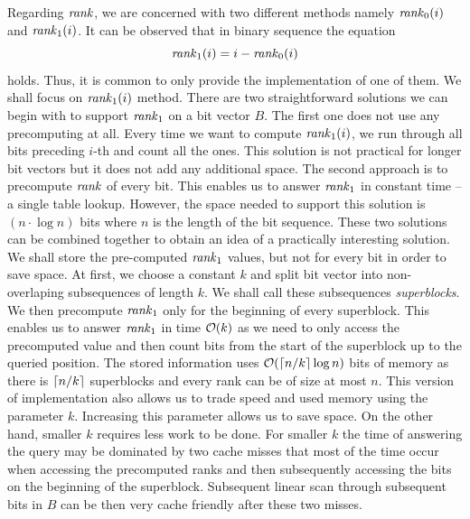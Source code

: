 Regarding $\mathit{rank}$, we are concerned with two different methods namely $\mathit{rank}_0(i)$
and $\mathit{rank}_1(i)$. It can be observed that in binary sequence the equation
$$\mathit{rank}_1(i) = i - \mathit{rank}_0(i)$$ holds. Thus, it is common to only provide
the implementation of one of them. We shall focus on $\mathit{rank}_1(i)$ method. There are two
straightforward solutions we can begin with to support $\mathit{rank}_1$ on a bit vector
$B$. The first one does not use any precomputing at all. Every time we want
to compute $\mathit{rank}_1(i)$, we run through all bits preceding $i$-th and count all
the ones. This solution is not practical for longer bit vectors but it does not
add any additional space. The second approach is to precompute $\mathit{rank}$ of every
bit. This enables us to answer $\mathit{rank}_1$ in constant time -- a single table lookup.
However, the space needed to support this solution is $(n\cdot\log n)$ bits where
$n$ is the length of the bit sequence. These two solutions can be combined together
to obtain an idea of a practically interesting solution. We shall store the
pre-computed $\mathit{rank}_1$ values, but not for every bit in order to save space. At first,
we choose a constant $k$ and split bit vector into non-overlaping subsequences of length
$k$. We shall call these subsequences \textit{superblocks}. We then precompute $\mathit{rank}_1$
only for the beginning of every superblock. This enables us to answer $\mathit{rank}_1$ in time $\mathcal{O}(k)$
as we need to only access the precomputed value and then count bits from the start of the
superblock up to the queried position. The stored information uses $\mathcal{O}(\left\lceil n/k \right\rceil\log n)$
bits of memory as there is $\left\lceil n/k \right\rceil$ superblocks and every rank can be of size at most $n$.
This version of implementation also allows us to trade speed and used memory using the parameter
$k$. Increasing this parameter allows us to save space. On the other hand, smaller $k$
requires less work to be done. For smaller $k$ the time of answering the query may be
dominated by two cache misses that most of the time occur when accessing the precomputed ranks
and then subsequently accessing the bits on the beginning of the superblock. Subsequent linear
scan through subsequent bits in $B$ can be then very cache friendly after these two misses.

